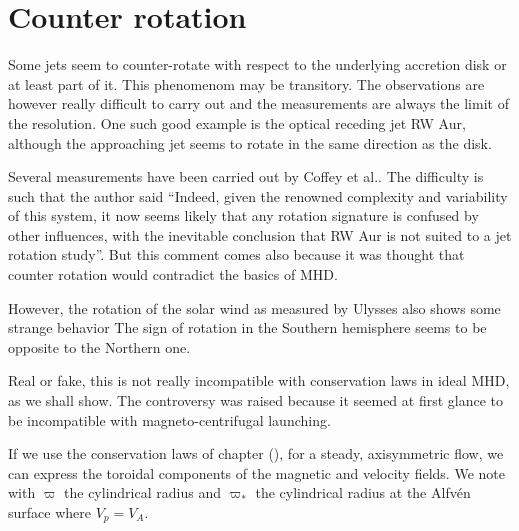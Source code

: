 \documentclass[10pt,a4paper,english]{article}
\begin{document}
\section{Counter rotation}
\label{sec:counter_rotation}
Some jets seem to counter-rotate with respect to the underlying accretion disk or at least part of it. This phenomenom may be transitory. The observations are however really difficult to carry out and the measurements are always the limit of the resolution. One such good example is the optical receding jet RW Aur, although the approaching jet seems to rotate in the same direction as the disk.

Several measurements have been carried out by Coffey et al.. The difficulty is such that the author said ``Indeed, given the renowned complexity and variability of this system, it now seems likely that any rotation signature is confused by other influences, with the inevitable conclusion that RW Aur is not suited to a jet rotation study''. But this comment comes also because it was thought that counter rotation would contradict the basics of MHD.

However, the rotation of the solar wind as measured by Ulysses also shows some strange behavior The sign of rotation in the Southern hemisphere seems to be opposite to the Northern one.

Real or fake, this is not really incompatible with conservation laws in ideal MHD, as we shall show. The controversy was raised because it seemed at first glance to be incompatible with magneto-centrifugal launching.


If we use the conservation laws of chapter (), for a steady, axisymmetric flow, we can express the toroidal components of the magnetic and velocity fields. We note with $\varpi$ the cylindrical radius and $\varpi_*$ the cylindrical radius at the Alfvén surface where $V_p = V_A$.
\end{document}
